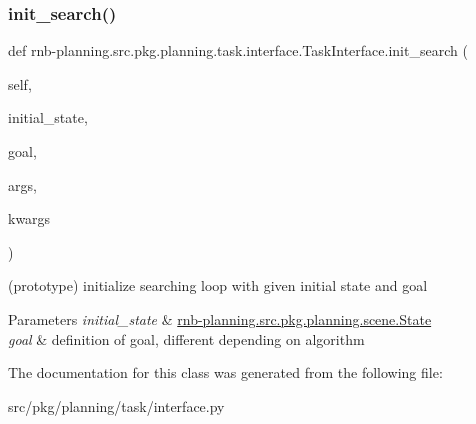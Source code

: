 \subsubsection{\texorpdfstring{init\+\_\+search()}{init\_search()}}
{\footnotesize\ttfamily def rnb-\/planning.\+src.\+pkg.\+planning.\+task.\+interface.\+Task\+Interface.\+init\+\_\+search (\begin{DoxyParamCaption}\item[{}]{self,  }\item[{}]{initial\+\_\+state,  }\item[{}]{goal,  }\item[{}]{args,  }\item[{}]{kwargs }\end{DoxyParamCaption})}



(prototype) initialize searching loop with given initial state and goal 


\begin{DoxyParams}{Parameters}
{\em initial\+\_\+state} & \hyperlink{classrnb-planning_1_1src_1_1pkg_1_1planning_1_1scene_1_1_state}{rnb-\/planning.\+src.\+pkg.\+planning.\+scene.\+State} \\
\hline
{\em goal} & definition of goal, different depending on algorithm \\
\hline
\end{DoxyParams}


The documentation for this class was generated from the following file\+:\begin{DoxyCompactItemize}
\item 
src/pkg/planning/task/interface.\+py\end{DoxyCompactItemize}
